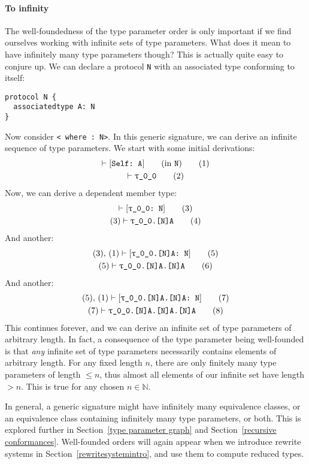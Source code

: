 \documentclass[../generics]{subfiles}
\begin{document}
\paragraph{To infinity} The well-foundedness of the type parameter order is only important if we find ourselves working with infinite sets of type parameters. What does it mean to have infinitely many type parameters though? This is actually quite easy to conjure up. We can declare a protocol \texttt{N} with an associated type conforming to itself:
\begin{Verbatim}
protocol N {
  associatedtype A: N
}
\end{Verbatim}
Now consider \texttt{< where :~N>}. In this generic signature, we can derive an infinite sequence of type parameters. We start with some initial derivations:
\begin{gather}
\vdash[\texttt{Self:~A}]\qquad\mbox{(in \texttt{N})}\tag{1}\\
\vdash\texttt{$\uptau$\_0\_0}\tag{2}
\end{gather}
Now, we can derive a dependent member type:
\begin{gather}
\vdash[\texttt{\texttt{$\uptau$\_0\_0}:~N}]\tag{3}\\
(3)\vdash\texttt{\texttt{$\uptau$\_0\_0}.[N]A}\tag{4}
\end{gather}
And another:
\begin{gather}
(3),\,(1)\vdash[\texttt{\texttt{$\uptau$\_0\_0}.[N]A:~N}]\tag{5}\\
(5)\vdash\texttt{\texttt{$\uptau$\_0\_0}.[N]A.[N]A}\tag{6}
\end{gather}
And another:
\begin{gather}
(5),\,(1)\vdash[\texttt{\texttt{$\uptau$\_0\_0}.[N]A.[N]A:~N}]\tag{7}\\
(7)\vdash\texttt{\texttt{$\uptau$\_0\_0}.[N]A.[N]A.[N]A}\tag{8}
\end{gather}
This continues forever, and we can derive an infinite set of type parameters of arbitrary length. In fact, a consequence of the type parameter being well-founded is that \emph{any} infinite set of type parameters necessarily contains elements of arbitrary length. For any fixed length $n$, there are only finitely many type parameters of length $\le n$, thus almost all elements of our infinite set have length $> n$. This is true for any chosen $n\in\mathbb{N}$.

In general, a generic signature might have infinitely many equivalence classes, or an equivalence class containing infinitely many type parameters, or both. This is explored further in Section~\ref{type parameter graph} and Section~\ref{recursive conformances}. Well-founded orders will again appear when we introduce rewrite systems in Section~\ref{rewritesystemintro}, and use them to compute reduced types.
\end{document}
